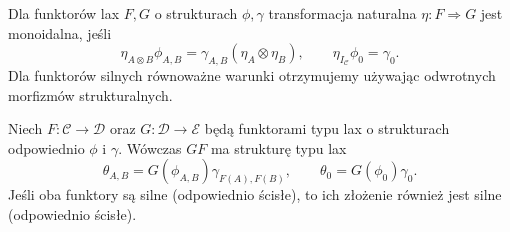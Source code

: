 \begin{definicja}\label{cat:def:monoidal-natural}
Dla funktorów lax $F,G$ o strukturach $\phi,\gamma$ transformacja naturalna $\eta:F\Rightarrow G$ jest monoidalna, jeśli
\[
\eta_{A\otimes B}\phi_{A,B}
=\gamma_{A,B}(\eta_A\otimes\eta_B),\qquad
\eta_{I_{\mathcal C}}\phi_0=\gamma_0.
\]
Dla funktorów silnych równoważne warunki otrzymujemy używając odwrotnych morfizmów strukturalnych.
\end{definicja}

\begin{stwierdzenie}\label{cat:prop:monoidal-composition}
Niech $F:\mathcal C\to\mathcal D$ oraz $G:\mathcal D\to\mathcal E$ będą funktorami typu lax o strukturach odpowiednio $\phi$ i $\gamma$. Wówczas $GF$ ma strukturę typu lax
\[
\theta_{A,B}=G(\phi_{A,B})\gamma_{F(A),F(B)},\qquad
\theta_0=G(\phi_0)\gamma_0.
\]
Jeśli oba funktory są silne (odpowiednio ścisłe), to ich złożenie również jest silne (odpowiednio ścisłe).
\end{stwierdzenie}
